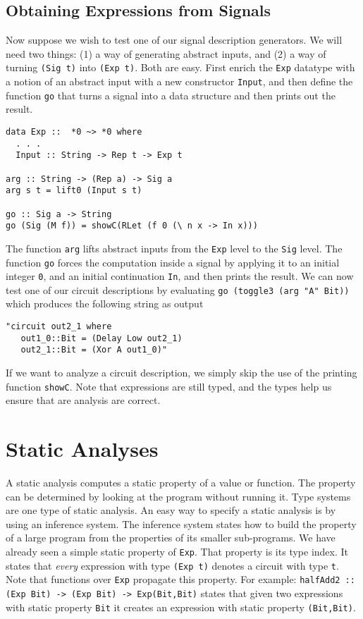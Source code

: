 \documentclass[10pt,twoside]{article}
\begin{document}
\subsection{Obtaining Expressions from Signals}
Now suppose we wish to test one of our signal description
generators. We will need two things: (1) a way of generating
abstract inputs, and (2) a way of turning {\tt (Sig t)} into {\tt (Exp t)}.
Both are easy. First enrich the {\tt Exp} datatype with a notion of
an abstract input with a new constructor {\tt Input}, and
then define the function {\tt go} that turns a signal into a data
structure and then prints out the result.
\begin{verbatim}
data Exp ::  *0 ~> *0 where
  . . .
  Input :: String -> Rep t -> Exp t

arg :: String -> (Rep a) -> Sig a
arg s t = lift0 (Input s t)

go :: Sig a -> String
go (Sig (M f)) = showC(RLet (f 0 (\ n x -> In x)))
\end{verbatim}
The function {\tt arg} lifts abstract inputs from the {\tt Exp} level
to the {\tt Sig} level. The function {\tt go} forces the computation
inside a signal by applying it to an initial integer {\tt 0}, and
an initial continuation {\tt In}, and then prints the result.
We can now test one of our circuit descriptions
by evaluating \verb+go (toggle3 (arg "A" Bit))+
which produces the following string as output
\begin{verbatim}
"circuit out2_1 where
   out1_0::Bit = (Delay Low out2_1)
   out2_1::Bit = (Xor A out1_0)" 
\end{verbatim}   
If we want to analyze a circuit description, we simply skip the use
of the printing function {\tt showC}. Note that expressions are
still typed, and the types help us ensure that are analysis
are correct.


\section{Static Analyses}\label{static}
A static analysis computes a static property of a value or function.
The property can be determined by looking at the program without running it.
Type systems are one type of static analysis. An easy way to specify
a static analysis is by using an inference system. The inference system
states how to build the property of a large program from the
properties of its smaller sub-programs. We have already seen a simple
static property of {\tt Exp}. That property is its type index. It states
that {\it every} expression with type {\tt (Exp t)} denotes a circuit
with type {\tt t}. Note that functions over {\tt Exp} propagate
this property. For example: \verb+halfAdd2 :: (Exp Bit) -> (Exp Bit) -> Exp(Bit,Bit)+
states that given two expressions with static property {\tt Bit} it
creates an expression with static property {\tt (Bit,Bit)}. 
\end{document}

